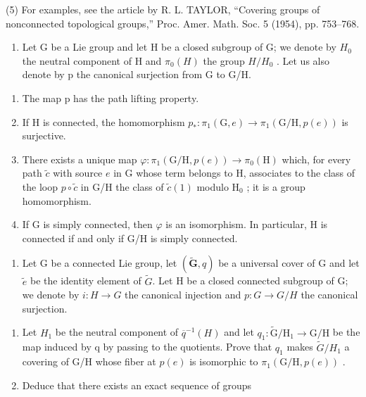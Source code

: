 (5) For examples, see the article by R. L. TAYLOR, “Covering groups of nonconnected topological groups,” Proc. Amer. Math. Soc. 5 (1954), pp. 753–768.

\begin{enumerate}
\def\labelenumi{\arabic{enumi})}
\setcounter{enumi}{7}
\tightlist
\item
  Let G be a Lie group and let H be a closed subgroup of G; we denote by \(H_{0}\) the neutral component of H and \(\pi_{0}(H)\) the group \(H/H_{0}\) . Let us also denote by p the canonical surjection from G to G/H.
\end{enumerate}

\begin{enumerate}
\def\labelenumi{\alph{enumi})}
\item
  The map p has the path lifting property.
\item
  If H is connected, the homomorphism \(p_{*}\colon\pi_{1}(\mathrm{G},e)\to\pi_{1}(\mathrm{G}/\mathrm{H},p(e))\) is surjective.
\item
  There exists a unique map \(\varphi\colon\pi_{1}(\mathrm{G/H},p(e))\to\pi_{0}(\mathrm{H})\) which, for every path \(\widetilde{c}\) with source \(e\) in G whose term belongs to H, associates to the class of the loop \(p\circ\widetilde{c}\) in G/H the class of \(\widetilde{c}(1)\) modulo \(\mathrm{H}_{0}\) ; it is a group homomorphism.
\item
  If G is simply connected, then \(\varphi\) is an isomorphism. In particular, H is connected if and only if G/H is simply connected.
\end{enumerate}

\begin{enumerate}
\def\labelenumi{\arabic{enumi})}
\setcounter{enumi}{8}
\tightlist
\item
  Let G be a connected Lie group, let \((\widetilde{\mathbf{G}}, q)\) be a universal cover of G and let \(\widetilde{e}\) be the identity element of \(\widetilde{G}\). Let H be a closed connected subgroup of G; we denote by \(i: H \to G\) the canonical injection and \(p: G \to G/H\) the canonical surjection.
\end{enumerate}

\begin{enumerate}
\def\labelenumi{\alph{enumi})}
\item
  Let \(H_{1}\) be the neutral component of \(\overline{q}^{-1}(H)\) and let \(q_{1}\colon\widetilde{\mathrm{G}}/\mathrm{H}_{1}\to\mathrm{G}/\mathrm{H}\) be the map induced by q by passing to the quotients. Prove that \(q_{1}\) makes \(\widetilde{G}/H_{1}\) a covering of G/H whose fiber at \(p(e)\) is isomorphic to \(\pi_{1}(\mathrm{G}/\mathrm{H},p(e))\) .
\item
  Deduce that there exists an exact sequence of groups
\end{enumerate}

